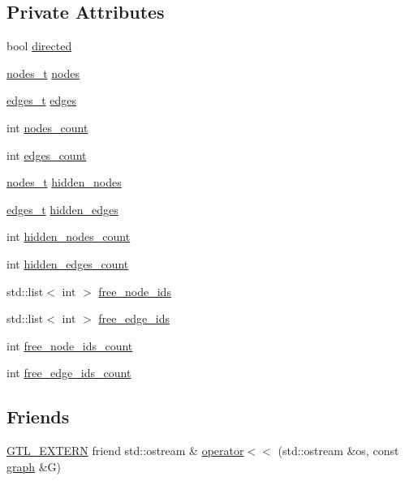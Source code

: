 \subsection*{Private Attributes}
\begin{DoxyCompactItemize}
\item 
bool \mbox{\hyperlink{classgraph_ab4120df210eb3d03d20b0bd27f8cbe8c}{directed}}
\item 
\mbox{\hyperlink{edge_8h_a22ac17689106ba21a84e7bc54d1199d6}{nodes\+\_\+t}} \mbox{\hyperlink{classgraph_a4ea0592e8eb7c26c5abad24546907726}{nodes}}
\item 
\mbox{\hyperlink{edge_8h_a8f9587479bda6cf612c103494b3858e3}{edges\+\_\+t}} \mbox{\hyperlink{classgraph_ab5b1c610cca1bcf72b05aacc28a48153}{edges}}
\item 
int \mbox{\hyperlink{classgraph_a1f59223d0bcf647920963d7a661dd74a}{nodes\+\_\+count}}
\item 
int \mbox{\hyperlink{classgraph_af560ff4263ad165c166a46084e781b4a}{edges\+\_\+count}}
\item 
\mbox{\hyperlink{edge_8h_a22ac17689106ba21a84e7bc54d1199d6}{nodes\+\_\+t}} \mbox{\hyperlink{classgraph_a7a3f2842a409a4b35ca8ef34598df9ca}{hidden\+\_\+nodes}}
\item 
\mbox{\hyperlink{edge_8h_a8f9587479bda6cf612c103494b3858e3}{edges\+\_\+t}} \mbox{\hyperlink{classgraph_a0d3da33d047ba7cdc3dc68b5d9c84b88}{hidden\+\_\+edges}}
\item 
int \mbox{\hyperlink{classgraph_aa72548d972d226a69f7f8fb92b363860}{hidden\+\_\+nodes\+\_\+count}}
\item 
int \mbox{\hyperlink{classgraph_a3151f544e049fbd985204ca9d8f74c97}{hidden\+\_\+edges\+\_\+count}}
\item 
std\+::list$<$ int $>$ \mbox{\hyperlink{classgraph_ae3f535853434924927a21d7725445aab}{free\+\_\+node\+\_\+ids}}
\item 
std\+::list$<$ int $>$ \mbox{\hyperlink{classgraph_a2bef57ea1db5b5541b3cce866de179f0}{free\+\_\+edge\+\_\+ids}}
\item 
int \mbox{\hyperlink{classgraph_a9480e2310fe64c3a8ad295bb3f119772}{free\+\_\+node\+\_\+ids\+\_\+count}}
\item 
int \mbox{\hyperlink{classgraph_a336be547b5e0ca43b96cf00131e0e1da}{free\+\_\+edge\+\_\+ids\+\_\+count}}
\end{DoxyCompactItemize}
\subsection*{Friends}
\begin{DoxyCompactItemize}
\item 
\mbox{\hyperlink{_g_t_l_8h_a014cd1e9b3e67a78ae433eda95c8fd25}{G\+T\+L\+\_\+\+E\+X\+T\+E\+RN}} friend std\+::ostream \& \mbox{\hyperlink{classgraph_a8f5a0a75aaee54ab9b35dc9b777684aa}{operator$<$$<$}} (std\+::ostream \&os, const \mbox{\hyperlink{classgraph}{graph}} \&G)
\end{DoxyCompactItemize}



